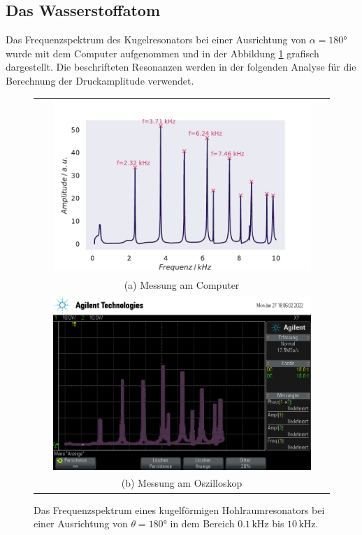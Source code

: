 \subsection{Das Wasserstoffatom}
Das Frequenzspektrum des Kugelresonators bei einer Ausrichtung von $\alpha = 180°$ wurde mit dem Computer aufgenommen und in der Abbildung \ref{fig:h180} grafisch dargestellt. 
Die beschrifteten Resonanzen werden in der folgenden Analyse für die Berechnung der Druckamplitude verwendet. 
\begin{figure}[H]
    \centering
    \begin{tabular}{c}
    \includegraphics[width=0.9\textwidth]{Daten/Wasserstoff/neu/H_180.pdf} \\
    (a) Messung am Computer \\[6pt]
    \includegraphics[width=0.9\textwidth]{Daten/Oszilloskop/scope_4.png} \\
    (b) Messung am Oszilloskop \\[6pt]
    \end{tabular}
    \caption{Das Frequenzspektrum eines kugelförmigen Hohlraumresonators bei einer Ausrichtung von $\theta = 180\si{°}$ in dem Bereich $0.1 \,\si{\kilo\hertz}$ bis $10 \,\si{\kilo\hertz}$. }
    \label{fig:h180}
\end{figure}

